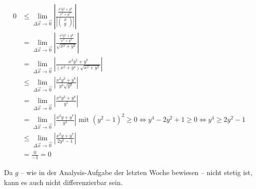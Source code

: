 \documentclass[10pt,a4paper,parskip=half]{scrartcl}
\begin{document}
\begin{enumerate}[(i)]
\begin{align*}
0 &\le \lim_{\Delta \vec x \to \vec 0} \left|\frac{\frac{x^2y^2+y^8}{x^2 + y^4}}{\left|\begin{pmatrix}x\\y\end{pmatrix}\right|}\right|\\
&= \lim_{\Delta \vec x \to \vec 0} \left|\frac{\frac{x^2y^2+y^8}{x^2 + y^4}}{\sqrt{x^2+y^2}}\right| \\
&= \lim_{\Delta \vec x \to \vec 0} \left|\frac{x^2y^2+y^8}{(x^2 + y^4)\sqrt{x^2+y^2}}\right| \\
&\le \lim_{\Delta \vec x \to \vec 0} \left|\frac{x^2y^2+y^8}{y^4\sqrt{y^2}}\right| \\
&= \lim_{\Delta \vec x \to \vec 0} \left|\frac{x^2y^2+y^8}{y^5}\right| \\
&= \lim_{\Delta \vec x \to \vec 0} \left|\frac{x^2y+y^7}{y^4}\right| \text{ mit } (y^2 -1)^2 \ge 0 \Leftrightarrow y^4 - 2y^2 + 1 \ge 0 \Leftrightarrow y^4 \ge 2y^2 -1\\
&\le \lim_{\Delta \vec x \to \vec 0} \left|\frac{x^2y+y^7}{2y^2 -1}\right| \\
&= \frac{0}{-1} = 0
\end{align*}

Da $g$ -- wie in der Analysis-Aufgabe der letzten Woche bewiesen -- nicht stetig ist, kann es auch nicht differenzierbar sein.
\newpage

\end{enumerate}
\end{document}
